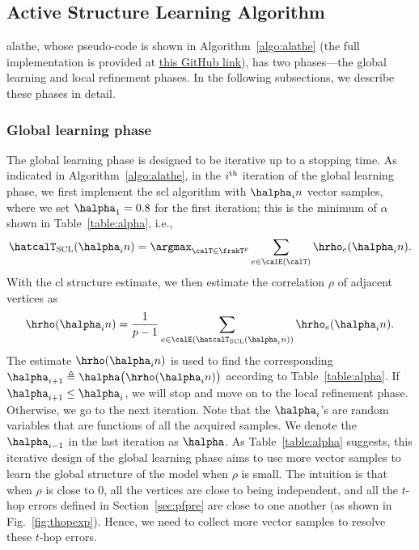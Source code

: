\documentclass[11pt,onecolumn]{article}
\begin{document}
\subsection{Active Structure Learning Algorithm}
 \ac{alathe}, whose pseudo-code is shown in Algorithm~\ref{algo:alathe} (the full implementation is provided at   \textcolor{blue}{\href{https://github.com/Zhang-Fengzhuo/Active-LATHE}{this    GitHub link}}), has two phases---the global learning  and  local refinement phases. In the following subsections, we describe these phases in detail.
\subsubsection{Global learning phase}
The global learning phase is designed to be iterative up to a stopping time. As indicated in Algorithm~\ref{algo:alathe}, in the $i^{{\rm th}}$ iteration of the global learning phase, we first implement the \ac{scl} algorithm 
with $\halpha_{i}n$ vector samples, where we set $\halpha_{1}=0.8$ for the first iteration; this is the minimum   of $\alpha$ shown in Table~\ref{table:alpha}, i.e., 
\begin{align}\label{eq:clvariant}
	\hatcalT_{\rm{SCL}}(\halpha_{i}n)=\argmax_{\calT\in\frakT^{p}} \sum_{e\in\calE(\calT)} \hrho_{e}(\halpha_{i}n).
\end{align}
With the \ac{cl} structure estimate, we then estimate the correlation $\rho$ of adjacent vertices as
\begin{align}\label{eq:rhohat}
	\hrho(\halpha_{i}n)=\frac{1}{p-1}\sum_{e\in\calE(\hatcalT_{\rm{SCL}}(\halpha_{i}n) )}\hrho_{e}(\halpha_{i}n) .
\end{align}
The estimate $\hrho(\halpha_{i}n)$ is used to find the corresponding $\halpha_{i+1} \triangleq \halpha\big(\hrho(\halpha_{i}n)\big)$ according to Table~\ref{table:alpha}. If $\halpha_{i+1}\leq \halpha_{i}$, we will stop and move on to the local refinement phase. Otherwise, we go to the next 
iteration. Note that   the $\halpha_{i}$'s are  random variables that are  functions of all the acquired samples. We denote the $\halpha_{i-1}$ in the last iteration as $\halpha$. As Table~\ref{table:alpha} suggests, this iterative design of the global learning phase aims to use more vector samples to learn the global structure of the model when $\rho$ is small. 
The intuition is that when $\rho$ is close to 0, all the vertices are close to being independent, and all the $t$-hop errors defined in Section~\ref{sec:pfpre} are close to one another (as shown in Fig.~\ref{fig:thopexp}). Hence, we need to collect more vector samples to resolve these $t$-hop errors.
\end{document}
